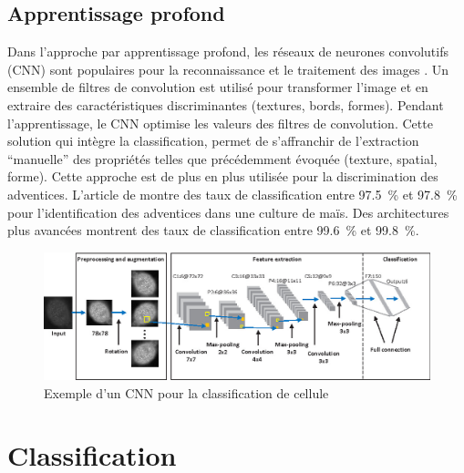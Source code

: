\documentclass[../thesis.tex]{subfiles}
\begin{document}
    \subsection{Apprentissage profond}
    
    Dans l'approche par apprentissage profond, les réseaux de neurones convolutifs (CNN) sont populaires pour la reconnaissance et le traitement des images \cite{Hasan2021}. Un ensemble de filtres de convolution est utilisé pour transformer l'image et en extraire des caractéristiques discriminantes (textures, bords, formes). Pendant l'apprentissage, le CNN optimise les valeurs des filtres de convolution. Cette solution qui intègre la classification, permet de s'affranchir de l'extraction ``manuelle'' des propriétés telles que précédemment évoquée (texture, spatial, forme). Cette approche est de plus en plus utilisée \cite{Hasan2021} pour la discrimination des adventices. L'article de \cite{rs12244185} montre des taux de classification entre \SI{97.5}{\percent} et \SI{97.8}{\percent} pour l'identification des adventices dans une culture de maïs. Des architectures plus avancées \cite{reedha2021vision} montrent des taux de classification entre \SI{99.6}{\percent} et \SI{99.8}{\percent}.
    
    \begin{figure}[H]
        \centering
        \includegraphics[width=.9\linewidth]{img/biblio/feature-cnn}
        \caption{Exemple d'un CNN pour la classification de cellule}
        \label{fig:03-feature-cnn}
    \end{figure}
    
    \newpage
    \section{Classification}
    
\end{document}

